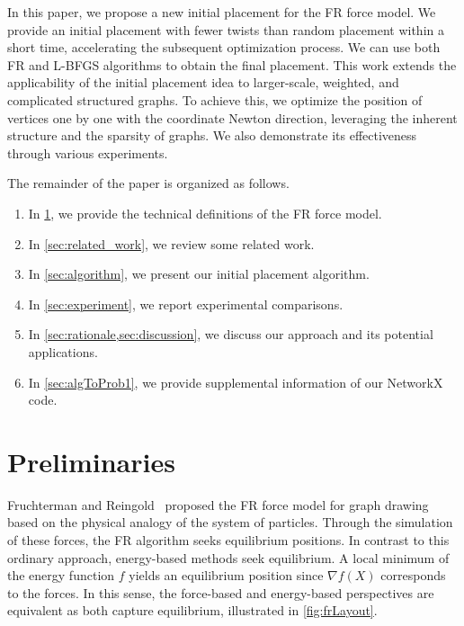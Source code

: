 \documentclass[11pt]{article}
\begin{document}
In this paper, we propose a new initial placement for the FR force model. We provide an initial placement with fewer twists than random placement within a short time, accelerating the subsequent optimization process. We can use both FR and L-BFGS algorithms to obtain the final placement. This work extends the applicability of the initial placement idea to larger-scale, weighted, and complicated structured graphs. To achieve this, we optimize the position of vertices one by one with the coordinate Newton direction, leveraging the inherent structure and the sparsity of graphs. We also demonstrate its effectiveness through various experiments.

The remainder of the paper is organized as follows.
\begin{enumerate}[label=\textbullet, itemsep=0pt, parsep=0pt]
  \item In \cref{sec:preliminaries}, we provide the
        technical definitions of the FR force model.

  \item In \cref{sec:related_work}, we review some related work.

  \item In \cref{sec:algorithm}, we present our initial placement algorithm.

  \item In \cref{sec:experiment}, we report experimental comparisons.

  \item In \cref{sec:rationale,sec:discussion}, we discuss our approach and its potential applications.

  \item In \cref{sec:algToProb1}, we provide supplemental information of our NetworkX code.
\end{enumerate}

\section{Preliminaries}
\label{sec:preliminaries}

Fruchterman and Reingold~\citep{fruchtermanGraphDrawingForcedirected1991}
proposed the FR force model for graph drawing based on the physical analogy of the system of particles. Through the simulation of these forces, the FR algorithm seeks equilibrium positions. In contrast to this ordinary approach, energy-based methods seek equilibrium.
A local minimum of the energy function $f$ yields an equilibrium position since $\nabla f (X)$ corresponds to the forces. In this sense, the force-based and energy-based perspectives are equivalent as both capture equilibrium, illustrated in \cref{fig:frLayout}.
\end{document}
